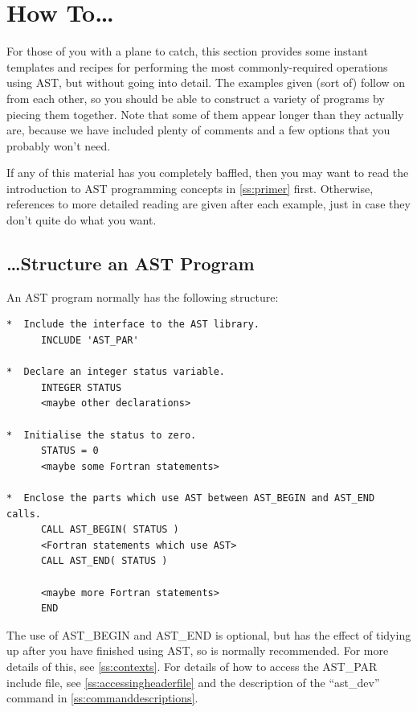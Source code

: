 \documentclass[twoside,11pt]{article}
\newcommand{\htmlref}[2]{#1}
\newcommand{\appref}[1]{Appendix~\ref{#1}}
\newcommand{\secref}[1]{\S\ref{#1}}
\renewcommand{\appref}[1]{\ref{#1}}
\renewcommand{\secref}[1]{\ref{#1}}
\begin{document}
\cleardoublepage
\section{\label{ss:howto}How To\ldots}

For those of you with a plane to catch, this section provides some
instant templates and recipes for performing the most
commonly-required operations using AST, but without going into
detail. The examples given (sort of) follow on from each other, so you
should be able to construct a variety of programs by piecing them
together.  Note that some of them appear longer than they actually
are, because we have included plenty of comments and a few options
that you probably won't need.

If any of this material has you completely baffled, then you may want
to read the introduction to AST programming concepts in
\secref{ss:primer} first. Otherwise, references to more detailed
reading are given after each example, just in case they don't quite do
what you want.

\subsection{\ldots Structure an AST Program}

An AST program normally has the following structure:

\small
\begin{verbatim}
*  Include the interface to the AST library.
      INCLUDE 'AST_PAR'

*  Declare an integer status variable.
      INTEGER STATUS
      <maybe other declarations>

*  Initialise the status to zero.
      STATUS = 0
      <maybe some Fortran statements>

*  Enclose the parts which use AST between AST_BEGIN and AST_END calls.
      CALL AST_BEGIN( STATUS )
      <Fortran statements which use AST>
      CALL AST_END( STATUS )

      <maybe more Fortran statements>
      END
\end{verbatim}
\normalsize

The use of \htmlref{AST\_BEGIN}{AST_BEGIN} and \htmlref{AST\_END}{AST_END} is optional, but has the effect of
tidying up after you have finished using AST, so is normally
recommended. For more details of this, see \secref{ss:contexts}. For
details of how to access the AST\_PAR include file, see
\secref{ss:accessingheaderfile} and the description of the
``\htmlref{ast\_dev}{ast_dev}'' command in \appref{ss:commanddescriptions}.
\end{document}

